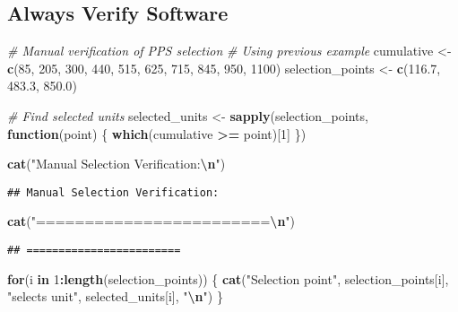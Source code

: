 \documentclass[
]{article}
\newenvironment{Shaded}{\begin{snugshade}}{\end{snugshade}}
\newcommand{\CommentTok}[1]{\textcolor[rgb]{0.56,0.35,0.01}{\textit{#1}}}
\newcommand{\ControlFlowTok}[1]{\textcolor[rgb]{0.13,0.29,0.53}{\textbf{#1}}}
\newcommand{\DecValTok}[1]{\textcolor[rgb]{0.00,0.00,0.81}{#1}}
\newcommand{\FloatTok}[1]{\textcolor[rgb]{0.00,0.00,0.81}{#1}}
\newcommand{\FunctionTok}[1]{\textcolor[rgb]{0.13,0.29,0.53}{\textbf{#1}}}
\newcommand{\NormalTok}[1]{#1}
\newcommand{\OtherTok}[1]{\textcolor[rgb]{0.56,0.35,0.01}{#1}}
\newcommand{\SpecialCharTok}[1]{\textcolor[rgb]{0.81,0.36,0.00}{\textbf{#1}}}
\newcommand{\StringTok}[1]{\textcolor[rgb]{0.31,0.60,0.02}{#1}}
\begin{document}
\subsection{Always Verify Software}\label{always-verify-software}

\begin{Shaded}
\begin{Highlighting}[]
\CommentTok{\# Manual verification of PPS selection}
\CommentTok{\# Using previous example}
\NormalTok{cumulative }\OtherTok{\textless{}{-}} \FunctionTok{c}\NormalTok{(}\DecValTok{85}\NormalTok{, }\DecValTok{205}\NormalTok{, }\DecValTok{300}\NormalTok{, }\DecValTok{440}\NormalTok{, }\DecValTok{515}\NormalTok{, }\DecValTok{625}\NormalTok{, }\DecValTok{715}\NormalTok{, }\DecValTok{845}\NormalTok{, }\DecValTok{950}\NormalTok{, }\DecValTok{1100}\NormalTok{)}
\NormalTok{selection\_points }\OtherTok{\textless{}{-}} \FunctionTok{c}\NormalTok{(}\FloatTok{116.7}\NormalTok{, }\FloatTok{483.3}\NormalTok{, }\FloatTok{850.0}\NormalTok{)}

\CommentTok{\# Find selected units}
\NormalTok{selected\_units }\OtherTok{\textless{}{-}} \FunctionTok{sapply}\NormalTok{(selection\_points, }\ControlFlowTok{function}\NormalTok{(point) \{}
  \FunctionTok{which}\NormalTok{(cumulative }\SpecialCharTok{\textgreater{}=}\NormalTok{ point)[}\DecValTok{1}\NormalTok{]}
\NormalTok{\})}

\FunctionTok{cat}\NormalTok{(}\StringTok{"Manual Selection Verification:}\SpecialCharTok{\textbackslash{}n}\StringTok{"}\NormalTok{)}
\end{Highlighting}
\end{Shaded}

\begin{verbatim}
## Manual Selection Verification:
\end{verbatim}

\begin{Shaded}
\begin{Highlighting}[]
\FunctionTok{cat}\NormalTok{(}\StringTok{"========================}\SpecialCharTok{\textbackslash{}n}\StringTok{"}\NormalTok{)}
\end{Highlighting}
\end{Shaded}

\begin{verbatim}
## ========================
\end{verbatim}

\begin{Shaded}
\begin{Highlighting}[]
\ControlFlowTok{for}\NormalTok{(i }\ControlFlowTok{in} \DecValTok{1}\SpecialCharTok{:}\FunctionTok{length}\NormalTok{(selection\_points)) \{}
  \FunctionTok{cat}\NormalTok{(}\StringTok{"Selection point"}\NormalTok{, selection\_points[i], }
      \StringTok{"selects unit"}\NormalTok{, selected\_units[i], }\StringTok{"}\SpecialCharTok{\textbackslash{}n}\StringTok{"}\NormalTok{)}
\NormalTok{\}}
\end{Highlighting}
\end{Shaded}
\end{document}
